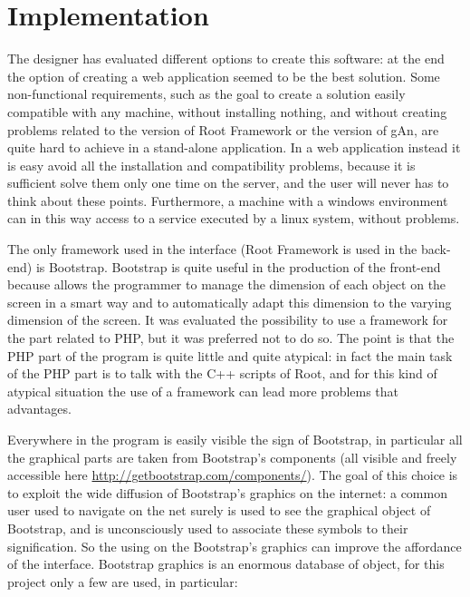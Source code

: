 
\chapter{Implementation} %

\label{Chapter5} %

The designer has evaluated different options to create this software: at the end the option of creating a web application seemed to be the best solution.
Some non-functional requirements, such as the goal to create a solution easily compatible with any machine, without installing nothing, and without creating problems related to the version of Root Framework or the version of gAn, are quite hard to achieve in a stand-alone application. In a web application instead it is easy avoid all the installation and compatibility problems, because it is sufficient solve them only one time on the server, and the user will never has to think about these points. Furthermore, a machine with a windows environment can in this way access to a service executed by a linux system, without problems.  

The only framework used in the interface (Root Framework is used in the back-end) is Bootstrap. Bootstrap is quite useful in the production of the front-end because allows the programmer to manage the dimension of each object on the screen in a smart way and to automatically adapt this dimension to the varying dimension of the screen. It was evaluated the possibility to use a framework for the part related to PHP, but it was preferred not to do so. The point is that the PHP part of the program is quite little and quite atypical: in fact the main task of the PHP part is to talk with the C++ scripts of Root, and for this kind of atypical situation the use of a framework can lead more problems that advantages.  

Everywhere in the program is easily visible the sign of Bootstrap, in particular all the graphical parts are taken from Bootstrap's components (all visible and freely accessible here \url{http://getbootstrap.com/components/}). The goal of this choice is to exploit the wide diffusion of Bootstrap's graphics on the internet: a common user used to navigate on the net surely is used to see the graphical object of Bootstrap, and is unconsciously used to associate these symbols to their signification. So the using on the Bootstrap's graphics can improve the affordance of the interface. 
Bootstrap graphics is an enormous database of object, for this project only a few are used, in particular:

